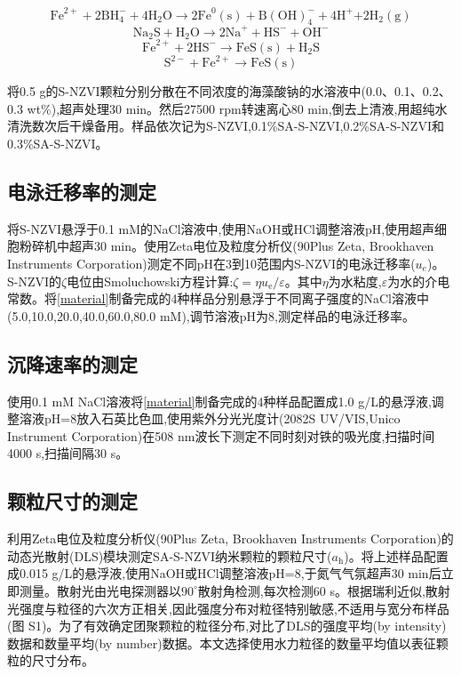 \begin{equation}\label{eq1}
    \mathrm{{Fe}^{2+}+2{BH}_4^-+4H_2O}\rightarrow \mathrm{2{Fe}^0\left(s\right)+{B\left(OH\right)}_4^-+4H^+}\mathrm{+2H_2\left(g\right)}
\end{equation}
\begin{equation}
    \mathrm{{Na}_2S+H_2O\rightarrow2{Na}^++{HS}^-+{OH}^-}
\end{equation}
\begin{equation}
    \mathrm{{Fe}^{2+}+2{HS}^-\rightarrow FeS(s)+H_2S}
\end{equation}
\begin{equation}\label{e16}
    \mathrm{S^{2-}+{Fe}^{2+}\rightarrow FeS(s)}
\end{equation}

将0.5 g的S-NZVI颗粒分别分散在不同浓度的海藻酸钠的水溶液中(0.0、0.1、0.2、0.3 wt\%),超声处理30 min。然后27500 rpm转速离心80 min,倒去上清液,用超纯水清洗数次后干燥备用。样品依次记为S-NZVI,0.1\%SA-S-NZVI,0.2\%SA-S-NZVI和0.3\%SA-S-NZVI。

\subsection{电泳迁移率的测定}

将S-NZVI悬浮于0.1 mM的NaCl溶液中,使用NaOH或HCl调整溶液pH,使用超声细胞粉碎机中超声30 min。使用Zeta电位及粒度分析仪(90Plus Zeta, Brookhaven Instruments Corporation)测定不同pH在3到10范围内S-NZVI的电泳迁移率($u_e$)。S-NZVI的$\zeta$电位由Smoluchowski方程计算:$\zeta=\eta u_\mathrm{e}/\varepsilon$。其中$\eta$为水粘度,$\varepsilon$为水的介电常数。将\cref{material}制备完成的4种样品分别悬浮于不同离子强度的NaCl溶液中(5.0,10.0,20.0,40.0,60.0,80.0 mM),调节溶液pH为8,测定样品的电泳迁移率。

\subsection{沉降速率的测定}

使用0.1 mM NaCl溶液将\cref{material}制备完成的4种样品配置成1.0 g/L的悬浮液,调整溶液pH=8放入石英比色皿,使用紫外分光光度计(2082S UV/VIS,Unico Instrument Corporation)在508 nm波长下测定不同时刻对铁的吸光度,扫描时间4000 s,扫描间隔30 s。

\subsection{颗粒尺寸的测定}

利用Zeta电位及粒度分析仪(90Plus Zeta, Brookhaven Instruments Corporation)的动态光散射(DLS)模块测定SA-S-NZVI纳米颗粒的颗粒尺寸($a_\mathrm{h}$)。将上述样品配置成0.015 g/L的悬浮液,使用NaOH或HCl调整溶液pH=8,于氮气气氛超声30 min后立即测量。散射光由光电探测器以$90^\circ$散射角检测,每次检测60 s。根据瑞利近似,散射光强度与粒径的六次方正相关,因此强度分布对粒径特别敏感,不适用与宽分布样品(图 S1)。为了有效确定团聚颗粒的粒径分布,对比了DLS的强度平均(by intensity)数据和数量平均(by number)数据。本文选择使用水力粒径的数量平均值以表征颗粒的尺寸分布。

